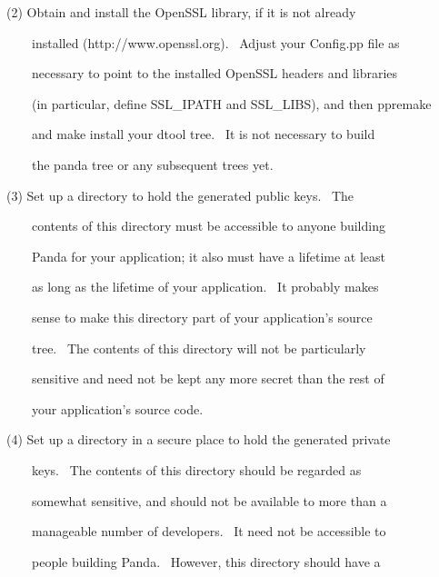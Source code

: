 \documentclass[a4paper]{article}
\begin{document}
\bigskip

{\color{black}
(2) Obtain and install the OpenSSL library, if it is not already}

{\color{black}
\ \ \ \ installed (http://www.openssl.org). \ Adjust your Config.pp file as}

{\color{black}
\ \ \ \ necessary to point to the installed OpenSSL headers and libraries}

{\color{black}
\ \ \ \ (in particular, define SSL\_IPATH and SSL\_LIBS), and then ppremake}

{\color{black}
\ \ \ \ and make install your dtool tree. \ It is not necessary to build}

{\color{black}
\ \ \ \ the panda tree or any subsequent trees yet.}


\bigskip

{\color{black}
(3) Set up a directory to hold the generated public keys. \ The}

{\color{black}
\ \ \ \ contents of this directory must be accessible to anyone building}

{\color{black}
\ \ \ \ Panda for your application; it also must have a lifetime at least}

{\color{black}
\ \ \ \ as long as the lifetime of your application. \ It probably makes}

{\color{black}
\ \ \ \ sense to make this directory part of your application's source}

{\color{black}
\ \ \ \ tree. \ The contents of this directory will not be particularly}

{\color{black}
\ \ \ \ sensitive and need not be kept any more secret than the rest of}

{\color{black}
\ \ \ \ your application's source code.}


\bigskip

{\color{black}
(4) Set up a directory in a secure place to hold the generated private}

{\color{black}
\ \ \ \ keys. \ The contents of this directory should be regarded as}

{\color{black}
\ \ \ \ somewhat sensitive, and should not be available to more than a}

\clearpage
\bigskip

{\color{black}
\ \ \ \ manageable number of developers. \ It need not be accessible to}

{\color{black}
\ \ \ \ people building Panda. \ However, this directory should have a}
\end{document}
